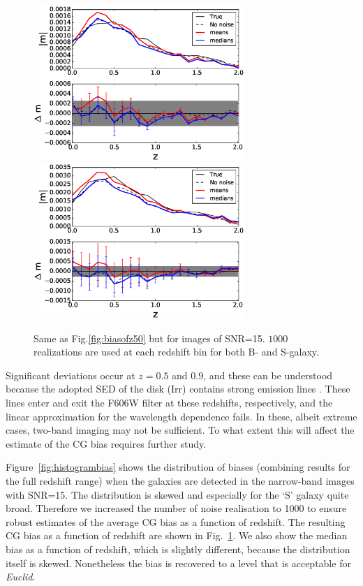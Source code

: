 \documentclass[useAMS,usenatbib]{mnras}
\begin{document}
\begin{figure}
  \includegraphics[width=8.0cm]{zs2n_b_snrtt15_medians.eps}
  \includegraphics[width=8.0cm]{zs2n_s_snrtt15_medians.eps}
\caption{Same as Fig.\ref{fig:biasofz50} but for images of SNR=15.
  $1000$ realizations are used at each redshift bin for both B- and
  S-galaxy.}
\label{fig:biasofz15}
\end{figure}
%

Significant deviations occur  at $z=0.5$ and $0.9$, and these can be understood
because the adopted SED of the disk (Irr) contains strong emission lines 
. These lines enter and exit the F606W filter
at these redshifts, respectively, and the linear approximation for the wavelength
dependence fails. In these, albeit extreme cases, two-band imaging may not
be sufficient. To what extent this will affect the estimate of the CG bias requires
further study.



Figure~\ref{fig:histogrambias} shows the distribution of biases (combining results for the
full redshift range) when the galaxies are detected in the narrow-band images with SNR=15.
The distribution is skewed and especially for the `S' galaxy quite broad. Therefore we 
increased the number of noise realisation to 1000 to ensure robust estimates of the average
CG bias as a function of redshift. The resulting CG bias as a function of redshift are shown
in Fig.~\ref{fig:biasofz15}. We also show the median bias as a function of redshift, which
is slightly different, because the distribution itself is skewed. Nonetheless the bias is
recovered to a level that is acceptable for {\it Euclid}. 
\end{document}
